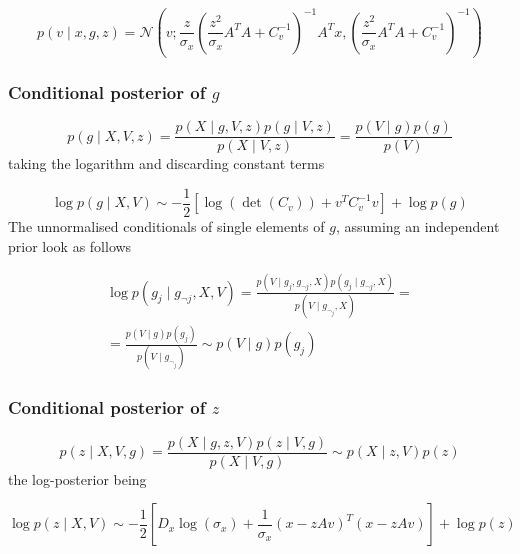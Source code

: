 \documentclass{paper}
\begin{document}
\begin{equation}
p(v \mid x,g,z) = \mathcal{N}\left(v; \frac{z}{ \sigma_x} \left( \frac{z^2}{ \sigma_x} A^T A + C_v^{-1}\right)^{-1} A^T x, \left(\frac{z^2}{\sigma_x} A^T A + C_v^{-1}\right)^{-1}\right)
\end{equation}


\subsubsection{Conditional posterior of $g$}

\begin{equation} 
p(g \mid X,V,z) = \frac{p(X \mid g,V,z) p(g \mid V,z)}{p(X \mid V,z)} = \frac{p(V \mid g) p(g)}{p(V)}
\end{equation}
%
taking the logarithm and discarding constant terms

\begin{equation} \label{eq:g_cond_logpost}
\log p(g \mid X,V) \sim -\frac{1}{2} \left[ \log(\det(C_v)) + v^T C_v^{-1} v\right] + \log p(g)
\end{equation}
%
The unnormalised conditionals of single elements of $g$, assuming an independent prior look as follows

\begin{equation} 
\begin{split}
\log p(g_j \mid g_{\neg j},X,V) = \frac{p(V \mid g_j,g_{\neg j},X) p(g_j \mid g_{\neg j},X)}{p(V \mid g_{\neg_j},X)} = \\
= \frac{ p(V \mid g) p(g_j) }{ p(V \mid g_{\neg_j}) } \sim p(V \mid g) p(g_j)
\end{split}
\end{equation}


\subsubsection{Conditional posterior of $z$}

\begin{equation} 
p(z \mid X,V,g) = \frac{p(X \mid g,z,V) p(z \mid V,g)}{p(X \mid V,g)} \sim p(X \mid z,V) p(z)
\end{equation}
% 
the log-posterior being

\begin{equation} \label{eq:z_cond_logpost}
\log p(z \mid X,V) \sim -\frac{1}{2} \left[ D_x\log(\sigma_x) + \frac{1}{\sigma_x} (x - zAv)^T (x - zAv)\right] + \log p(z)
\end{equation}
\end{document}
